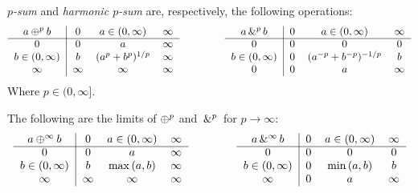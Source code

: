 \begin{definition}[$p$-Sum]
\label{$p$-Sum}
    \emph{$p$-sum} and \emph{harmonic $p$-sum} are, respectively, the following operations:
    \begin{equation*}
		\begin{tabular}{c|ccc}
			$a \psum{p} b$ & $0$ & $a \in (0,\infty)$ & $\infty$\\
			\cline{1-4}
			$0$ 			   & $0$ & $a$ 		& $\infty$\\
			$b \in (0,\infty)$ & $b$ & $(a^{p}+b^{p})^{1/p}$		& $\infty$\\
			$\infty$ 		   & $\infty$ & $\infty$ & $\infty$
		\end{tabular}
		\hspace*{10ex}
		\begin{tabular}{c|ccc}
			\textnormal{$a \phsum{p} b$} & $0$ & $a \in (0,\infty)$ & $\infty$\\
			\cline{1-4}
			$0$ 		 	   & $0$ 		& $0$ 	   & $0$\\
			$b \in (0,\infty)$ & $0$ 		& $(a^{-p}+b^{-p})^{-1/p}$	   & $b$\\
			$0$ 		   & $0$ 	& $a$ & $\infty$
		\end{tabular}
	\end{equation*}
    Where $p \in (0,\infty].$
\end{definition}

\begin{lemma}
    The following are the limits of $\oplus^{p}$ and $\,\&^{p}\,$ for $p \longrightarrow \infty$:
    \begin{equation*}
		\begin{tabular}{c|ccc}
			$a \psum{\infty} b$ & $0$ & $a \in (0,\infty)$ & $\infty$\\
			\cline{1-4}
			$0$ 			   & $0$ & $a$ 		& $\infty$\\
			$b \in (0,\infty)$ & $b$ & $\max{}(a,b)$		& $\infty$\\
			$\infty$ 		   & $\infty$ & $\infty$ & $\infty$
		\end{tabular}
		\hspace*{10ex}
		\begin{tabular}{c|ccc}
			\textnormal{$a \phsum{\infty} b$} & $0$ & $a \in (0,\infty)$ & $\infty$\\
			\cline{1-4}
			$0$ 		 	   & $0$ 		& $0$ 	   & $0$\\
			$b \in (0,\infty)$ & $0$ 		& $\min{}(a,b)$	   & $b$\\
			$\infty$ 		   & $0$ 	& $a$ & $\infty$
		\end{tabular}
	\end{equation*}
\end{lemma}


